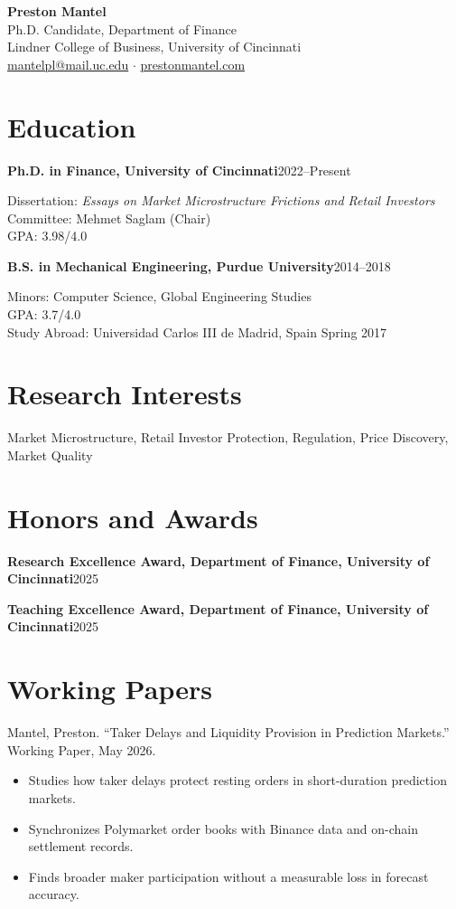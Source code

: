 \documentclass[11pt]{article}
\newcommand{\entry}[2]{\noindent\textbf{#1}\hfill #2\par}
\begin{document}
\begin{center}
  {\LARGE\bfseries Preston Mantel}\\[4pt]
  Ph.D. Candidate, Department of Finance\\
  Lindner College of Business, University of Cincinnati\\[3pt]
  \href{mailto:mantelpl@mail.uc.edu}{mantelpl@mail.uc.edu} \quad$\cdot$\quad
  \href{https://prestonmantel.com}{prestonmantel.com}
\end{center}

\section{Education}
\entry{Ph.D. in Finance, University of Cincinnati}{2022--Present}
Dissertation: \textit{Essays on Market Microstructure Frictions and Retail Investors}\\
Committee: Mehmet Saglam (Chair)\\
GPA: 3.98/4.0

\entry{B.S. in Mechanical Engineering, Purdue University}{2014--2018}
Minors: Computer Science, Global Engineering Studies\\
GPA: 3.7/4.0\\
Study Abroad: Universidad Carlos III de Madrid, Spain \hfill Spring 2017

\section{Research Interests}
Market Microstructure, Retail Investor Protection, Regulation, Price Discovery, Market Quality

\section{Honors and Awards}
\entry{Research Excellence Award, Department of Finance, University of Cincinnati}{2025}
\entry{Teaching Excellence Award, Department of Finance, University of Cincinnati}{2025}

\section{Working Papers}
Mantel, Preston. ``Taker Delays and Liquidity Provision in Prediction Markets.'' Working Paper, May 2026.
\begin{itemize}
  \item Studies how taker delays protect resting orders in short-duration prediction markets.
  \item Synchronizes Polymarket order books with Binance data and on-chain settlement records.
  \item Finds broader maker participation without a measurable loss in forecast accuracy.
\end{itemize}
\end{document}
